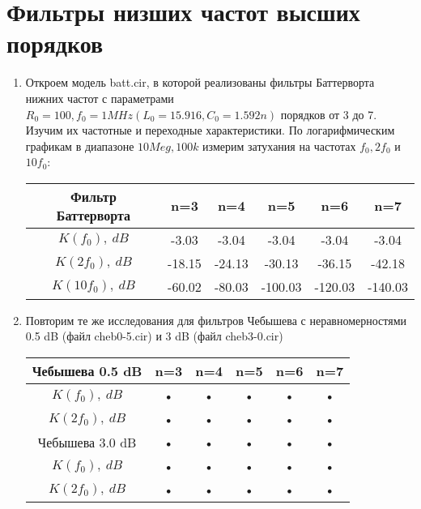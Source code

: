 \documentclass[a4paper, 12pt]{article}%
\begin{document}
\section{Фильтры низших частот высших порядков}

\begin{enumerate}

\item Откроем модель batt.cir, в которой реализованы фильтры Баттерворта нижних частот с параметрами $R_0 = 100, f_0 = 1MHz (L_0= 15.916, C_0 = 1.592n)$ порядков от 3 до 7. Изучим их частотные и переходные характеристики. По логарифмическим графикам в диапазоне $10Meg, 100k$ измерим затухания на частотах $f_0, 2f_0$ и $10f_0$:

\begin{center}
\begin{tabular}{|c|c|c|c|c|c|}
\hline 
Фильтр Баттерворта & n=3 & n=4 & n=5 & n=6 & n=7 \\ 
\hline 
$K(f_0), \: dB$ & -3.03 & -3.04 & -3.04 & -3.04 & -3.04 \\ 
\hline 
$K(2f_0), \: dB$ & -18.15 & -24.13 & -30.13 & -36.15 & -42.18 \\ 
\hline 
$K(10f_0), \: dB$ & -60.02 & -80.03 & -100.03 & -120.03 & -140.03 \\ 
\hline 
\end{tabular} 
\end{center}

\item Повторим те же исследования для фильтров Чебышева с неравномерностями 0.5 dB (файл cheb0-5.cir) и 3 dB (файл cheb3-0.cir)

\begin{center}
\begin{tabular}{|c|c|c|c|c|c|}
\hline 
Чебышева 0.5 dB & n=3 & n=4 & n=5 & n=6 & n=7 \\ 
\hline 
$K(f_0), \: dB$ & • & • & • & • & • \\ 
\hline 
$K(2f_0), \: dB$ & • & • & • & • & • \\ 
\hline 
Чебышева 3.0 dB & • & • & • & • & • \\ 
\hline 
$K(f_0), \: dB$ & • & • & • & • & • \\ 
\hline 
$K(2f_0), \: dB$ & • & • & • & • & • \\ 
\hline 
\end{tabular} 
\end{center}

\end{enumerate}
\end{document}
